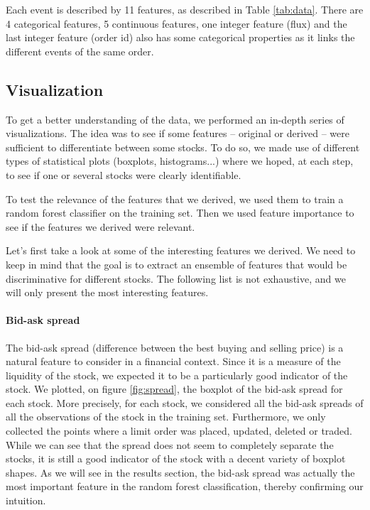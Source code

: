 \documentclass[switch, 11pt]{article}
\begin{document}
\begin{multicols}{2}
    Each event is described by 11 features, as described in Table \ref{tab:data}. There are 4 categorical features, 5 continuous features, one integer feature (flux) and the last integer feature (order id) also has some categorical properties as it links the different events of the same order.

    \subsection{Visualization}
    To get a better understanding of the data, we performed an in-depth series of visualizations. The idea was to see if some features -- original or derived -- were sufficient to differentiate between some stocks. To do so, we made use of different types of statistical plots (boxplots, histograms...) where we hoped, at each step, to see if one or several stocks were clearly identifiable.

    To test the relevance of the features that we derived, we used them to train a random forest classifier on the training set. Then we used feature importance to see if the features we derived were relevant.

    Let's first take a look at some of the interesting features we derived. We need to keep in mind that the goal is to extract an ensemble of features that would be discriminative for different stocks. The following list is not exhaustive, and we will only present the most interesting features.

    \paragraph{Bid-ask spread}
    The bid-ask spread (difference between the best buying and selling price) is a natural feature to consider in a financial context. Since it is a measure of the liquidity of the stock, we expected it to be a particularly good indicator of the stock. We plotted, on figure \ref{fig:spread}, the boxplot of the bid-ask spread for each stock. More precisely, for each stock, we considered all the bid-ask spreads of all the observations of the stock in the training set. Furthermore, we only collected the points where a limit order was placed, updated, deleted or traded. While we can see that the spread does not seem to completely separate the stocks, it is still a good indicator of the stock with a decent variety of boxplot shapes. As we will see in the results section, the bid-ask spread was actually the most important feature in the random forest classification, thereby confirming our intuition.


\end{multicols}
\end{document}

